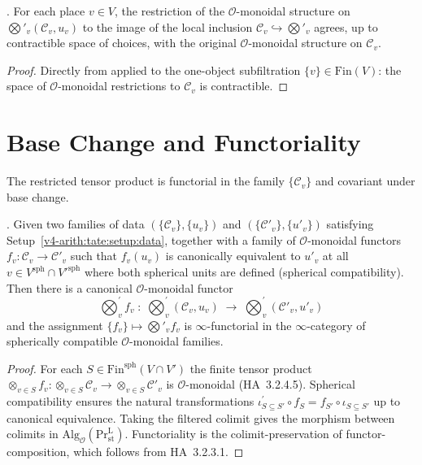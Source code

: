 \begin{corollary}
\label{v4-arith:tate:cor:uniqueness-fibers}
\ClaimStatusProvedHere. For each place \(v\in V\), the restriction of
the \(\mathcal{O}\)-monoidal structure on
\(\bigotimes'_{v}(\mathcal{C}_{v},u_{v})\) to the image of the local
inclusion \(\mathcal{C}_{v}\hookrightarrow\bigotimes'_{v}\) agrees,
up to contractible space of choices, with the original
\(\mathcal{O}\)-monoidal structure on \(\mathcal{C}_{v}\).
\end{corollary}

\begin{proof}
Directly from  applied to the
one-object subfiltration \(\{v\}\in\mathrm{Fin}(V)\): the space of
\(\mathcal{O}\)-monoidal restrictions to \(\mathcal{C}_{v}\) is
contractible.
\end{proof}

\section{Base Change and Functoriality}
\label{v4-arith:tate:base-change}

The restricted tensor product is functorial in the family
\(\{\mathcal{C}_{v}\}\) and covariant under base change.

\begin{proposition}
\label{v4-arith:tate:prop:functoriality-family}
\ClaimStatusProvedHere. Given two families of data
\((\{\mathcal{C}_{v}\},\{u_{v}\})\) and
\((\{\mathcal{C}'_{v}\},\{u'_{v}\})\) satisfying
Setup~\ref{v4-arith:tate:setup:data}, together with a family of
\(\mathcal{O}\)-monoidal functors
\(f_{v}:\mathcal{C}_{v}\to\mathcal{C}'_{v}\) such that \(f_{v}(u_{v})\)
is canonically equivalent to \(u'_{v}\) at all \(v\in V^{\mathrm{sph}}\cap V'^{\mathrm{sph}}\)
where both spherical units are defined (spherical compatibility).
Then there is a canonical \(\mathcal{O}\)-monoidal functor
\[
\bigotimes_{v}^{\prime}f_{v}\;:\;\bigotimes_{v}^{\prime}(\mathcal{C}_{v},u_{v})\;\longrightarrow\;\bigotimes_{v}^{\prime}(\mathcal{C}'_{v},u'_{v})
\]
and the assignment \(\{f_{v}\}\mapsto\bigotimes'_{v}f_{v}\) is
\(\infty\)-functorial in the \(\infty\)-category of spherically
compatible \(\mathcal{O}\)-monoidal families.
\end{proposition}

\begin{proof}
For each \(S\in\mathrm{Fin}^{\mathrm{sph}}(V\cap V')\) the finite
tensor product \(\otimes_{v\in S}f_{v}:\otimes_{v\in S}\mathcal{C}_{v}\to\otimes_{v\in S}\mathcal{C}'_{v}\)
is \(\mathcal{O}\)-monoidal (HA~3.2.4.5). Spherical compatibility
ensures the natural transformations
\(\iota_{S\subseteq S'}^{\prime}\circ f_{S}=f_{S'}\circ\iota_{S\subseteq S'}\)
up to canonical equivalence. Taking the filtered colimit gives
the morphism between colimits in
\(\mathrm{Alg}_{\mathcal{O}}(\mathrm{Pr}^{\mathrm{L}}_{\mathrm{st}})\).
Functoriality is the colimit-preservation of functor-composition,
which follows from HA~3.2.3.1.
\end{proof}


